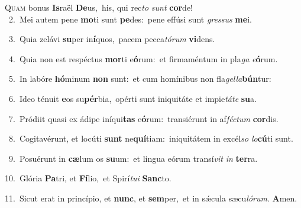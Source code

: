 \lettrine{\initial\textcolor{\initialcolor}{Q}}{uam} bonus \textbf{Is}\-raël \textbf{De}\-us,~\star his, qui rec\textit{to} \textit{sunt} \textbf{cor}\-de!\\
{\numbfont\textcolor{\numbcolor}{~2.}}~Mei autem pene \textbf{mo}\-ti sunt \textbf{pe}\-des:~\star pene effúsi sunt \textit{gres}\-\textit{sus} \textbf{me}\-i.\par
{\numbfont\textcolor{\numbcolor}{~3.}}~Quia zelávi \textbf{su}\-per in\-\textbf{í}\-quos,~\star pacem pecca\-\textit{tó}\-\textit{rum} \textbf{vi}\-dens.\par
{\numbfont\textcolor{\numbcolor}{~4.}}~Quia non est respéctus \textbf{mor}\-ti e\-\textbf{ó}\-rum:~\star et firmaméntum in pla\textit{ga} \textit{e}\-\textbf{ó}rum.\par
{\numbfont\textcolor{\numbcolor}{~5.}}~In labóre \textbf{hó}\-minum \textbf{non} sunt:~\star et cum homínibus non fla\-\textit{gel}\-\textit{la}\textbf{bún}tur:\par
{\numbfont\textcolor{\numbcolor}{~6.}}~Ideo ténuit \textbf{e}\-os su\-\textbf{pér}\-bia,~\star opérti sunt iniquitáte et impie\-\textit{tá}\-\textit{te} \textbf{su}\-a.\par
{\numbfont\textcolor{\numbcolor}{~7.}}~Pródiit quasi ex ádipe iníqui\textbf{tas} e\-\textbf{ó}\-rum:~\star transiérunt in af\-\textit{féc}\-\textit{tum} \textbf{cor}\-dis.\par
{\numbfont\textcolor{\numbcolor}{~8.}}~Cogitavérunt, et locúti \textbf{sunt} ne\-\textbf{quí}\-tiam:~\star iniquitátem in excél\textit{so} \textit{lo}\-\textbf{cú}ti sunt.\par
{\numbfont\textcolor{\numbcolor}{~9.}}~Posuérunt in \textbf{cæ}\-lum os \textbf{su}\-um:~\star et lingua eórum transí\textit{vit} \textit{in} \textbf{ter}\-ra.\par
{\numbfont\textcolor{\numbcolor}{10.}}~Glória \textbf{Pa}\-tri, et \textbf{Fí}\-lio,~\star et Spirí\-\textit{tu}\-\textit{i} \textbf{Sanc}\-to.\par
{\numbfont\textcolor{\numbcolor}{11.}}~Sicut erat in princípio, et \textbf{nunc}\-, et \textbf{sem}\-per,~\star et in sǽcula sæcu\-\textit{ló}\-\textit{rum}. \textbf{A}\-men.\par
